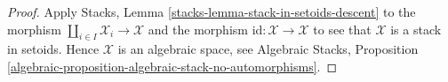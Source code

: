 \documentclass[10pt,a4paper]{amsart}
\theoremstyle{plain}
\theoremstyle{definition}
\theoremstyle{remark}
\numberwithin{equation}{subsection}
\begin{document}
\begin{proof}
Apply
Stacks, Lemma \ref{stacks-lemma-stack-in-setoids-descent}
to the morphism $\coprod_{i \in I} \mathcal{X}_i \to \mathcal{X}$
and the morphism $\text{id} : \mathcal{X} \to \mathcal{X}$ to
see that $\mathcal{X}$ is a stack in setoids.
Hence $\mathcal{X}$ is an algebraic space, see
Algebraic Stacks,
Proposition \ref{algebraic-proposition-algebraic-stack-no-automorphisms}.
\end{proof}
\end{document}
